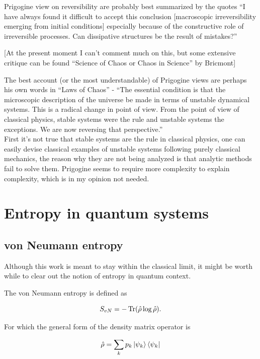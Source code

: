 \documentclass[a4paper,12pt,nofootinbib]{article}
\begin{document}
Prigogine view on reversibility are probably best summarized by the quotes {``}I have always found it difficult to accept this conclusion [macroscopic
irreversibility emerging from initial conditions] { }especially because of the constructive role of irreversible processes. Can dissipative structures
be the result of mistakes?{''}

[At the present moment I can{'}t comment much on this, but some extensive critique can be found {``}Science of Chaos or Chaos in Science{''} by Bricmont]

The best account (or the most understandable) of Prigogine views are perhaps his own words in {``}Laws of Chaos{''} - {``}The essential condition
is that the microscopic description of the universe be made in terms of unstable dynamical systems. This is a radical change in point of view. From
the point of view of classical physics, stable systems were the rule and unstable systems the exceptions. We are now reversing that perspective.{''}\\
First it{'}s not true that stable systems are the rule in classical physics, one can easily devise classical examples of unstable systems following
purely classical mechanics, the reason why they are not being analyzed is that analytic methods fail to solve them. Prigogine seems to require more
complexity to explain complexity, which is in my opinion not needed.

\section{Entropy in quantum systems}
\subsection{von Neumann entropy}

Although this work is meant to stay within the classical limit, it might be worth while to clear out the notion of entropy in quantum context.

The von Neumann entropy is defined as 

\begin{equation}
  S_{vN}= -\Tr(\hat{\rho} \log{\hat{\rho}}).
\end{equation}

For which the general form of the density matrix operator is

\begin{equation}
	\hat{\rho}=\sum_k p_k \ket{\psi_k}\bra{\psi_k} 
\end{equation}
\end{document}
